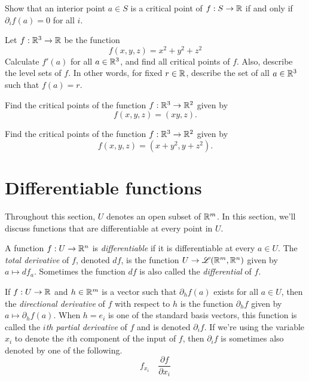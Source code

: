\begin{exercise}
	Show that an interior point $a \in S$ is a critical point of $f : S \to \mathbb{R}$ if and only if $\partial_i f(a) = 0$ for all $i$. 
\end{exercise}

\begin{exercise} \label{sphere-fibration}
	Let $f : \mathbb{R}^3 \to \mathbb{R}$ be the function
	\[ f(x,y,z) = x^2 + y^2 + z^2 \]
	Calculate $f'(a)$ for all $a \in \mathbb{R}^3$, and find all critical points of $f$. Also, describe the level sets of $f$. In other words, for fixed $r \in \mathbb{R}$, describe the set of all $a \in \mathbb{R}^3$ such that $f(a) = r$. 
\end{exercise}

\begin{exercise}
	Find the critical points of the function $f : \mathbb{R}^3 \to \mathbb{R}^2$ given by \[ f(x,y,z) = (xy, z). \]
\end{exercise}

\begin{exercise}
	Find the critical points of the function $f : \mathbb{R}^3 \to \mathbb{R}^2$ given by \[ f(x,y,z) = (x+y^2, y+z^2). \]
\end{exercise}

\section{Differentiable functions}

Throughout this section, $U$ denotes an open subset of $\mathbb{R}^m$. In this section, we'll discuss functions that are differentiable at every point in $U$. 

\begin{definition}  
	A function $f : U \to \mathbb{R}^n$ is \emph{differentiable} if it is differentiable at every $a \in U$. The \emph{total derivative} of $f$, denoted $df$, is the function $U \to \mathscr{L}(\mathbb{R}^m, \mathbb{R}^n)$ given by $a \mapsto df_a$. Sometimes the function $df$ is also called the \emph{differential} of $f$. 
\end{definition}

\begin{definition}
	If $f : U \to \mathbb{R}$ and $h \in \mathbb{R}^m$ is a vector such that $\partial_h f(a)$ exists for all $a \in U$, then the \emph{directional derivative} of $f$ with respect to $h$ is the function $\partial_h f$ given by $a \mapsto \partial_h f(a)$. When $h = e_i$ is one of the standard basis vectors, this function is called the \emph{$i$th partial derivative} of $f$ and is denoted $\partial_i f$. If we're using the variable $x_i$ to denote the $i$th component of the input of $f$, then $\partial_i f$ is sometimes also denoted by one of the following. 
	\[ f_{x_i} \quad \frac{\partial f}{\partial x_i} \]
\end{definition}

